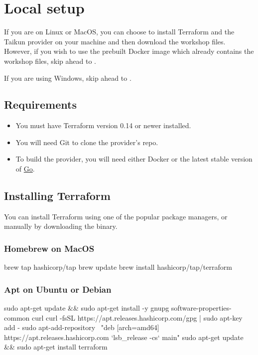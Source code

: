 \section{Local setup}

If you are on Linux or MacOS,
you can choose to install Terraform and the Taikun provider on your machine and
then download the workshop files.
However, if you wish to use the prebuilt Docker image which already contains
the workshop files, skip ahead to .

\begin{warn}
If you are using Windows, skip ahead to .
\end{warn}

\subsection{Requirements}
\begin{itemize}
  \item You must have Terraform version 0.14 or newer installed.
  \item You will need Git to clone the provider's repo.
  \item To build the provider, you will need either Docker or
    the latest stable version of \href{https://golang.org/dl/}{Go}.
\end{itemize}

\subsection{Installing Terraform}
You can install Terraform using one of the popular package managers, or manually by
downloading the binary.
\subsubsection{Homebrew on MacOS}
\begin{shell}
brew tap hashicorp/tap
brew update
brew install hashicorp/tap/terraform
\end{shell}

\subsubsection{Apt on Ubuntu or Debian}
\begin{shell}
sudo apt-get update && sudo apt-get install -y gnupg software-properties-common curl
curl -fsSL https://apt.releases.hashicorp.com/gpg | sudo apt-key add -
sudo apt-add-repository \
"deb [arch=amd64] https://apt.releases.hashicorp.com `lsb_release -cs` main"
sudo apt-get update && sudo apt-get install terraform
\end{shell}

